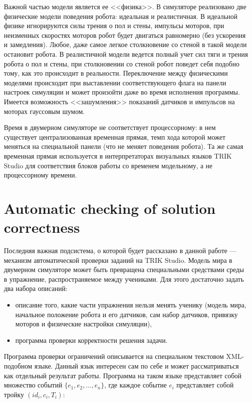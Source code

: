 \documentclass[conference]{IEEEtran}
\begin{document}
Важной частью модели является ее <<физика>>. В симуляторе реализовано две физические модели поведения робота: идеальная и реалистичная. В идеальной физике игнорируются силы трения о пол и стены, импульсы моторов, при неизменных скоростях моторов робот будет двигаться равномерно (без ускорения и замедления). Любое, даже самое легкое столкновение со стеной в такой модели остановит робота. В реалистичной модели ведется полный учет сил тяги и трения робота о пол и стены, при столкновении со стеной робот поведет себя подобно тому, как это происходит в реальности. Переключение между физическими моделями происходит при выставлении соответствующего флага на панели настроек симуляции и может произойти даже во время исполнения программы. Имеется возможность <<зашумления>> показаний датчиков и импульсов на моторах гауссовым шумом.

Время в двумерном симуляторе не соответствует процессорному: в нем существует централизованная временная прямая, темп хода которой может меняться на специальной панели (что не меняет поведения робота). Та же самая временная прямая используется в интерпретаторах визуальных языков TRIK Studio для соответствия блоков работы со временем модельному, а не процессорному времени.

\section{Automatic checking of solution correctness}
\label{chapter:constraintsChecker}

Последняя важная подсистема, о которой будет рассказано в данной работе --- механизм автоматической проверки заданий на TRIK Studio. Модель мира в двумерном симуляторе может быть превращена специальными средствами среды в упражнение, распространяемое между учениками. Для этого достаточно задать два набора описаний:

\begin{itemize}
    \item описание того, какие части упражнения нельзя менять ученику (модель мира, начальное положение робота и его датчиков, сам набор датчиков, привязку моторов и физические настройки симуляции),
    \item программа проверки корректности решения задачи.
\end{itemize}

Программа проверки ограничений описывается на специальном текстовом XML-подобном языке. Данный язык интересен сам по себе и может рассматриваться как отдельный результат работы. Программа на таком языке представляет собой множество событий $\{ e_1, e_2, ..., e_n \}$, где каждое событие 
$e_i$ представляет собой тройку $(id_i, c_i, T_i)$:
\end{document}
